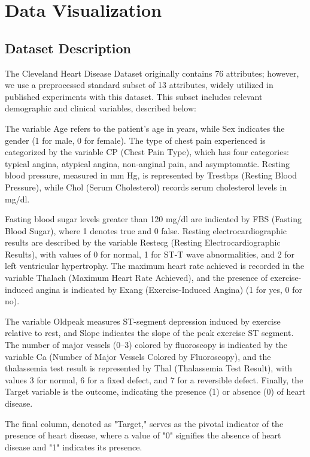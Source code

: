 \section{Data Visualization}
\label{sec:Data Visualization}
\subsection{Dataset Description}
The Cleveland Heart Disease Dataset\cite{HeartDiseaseCleveland} originally contains 76 attributes; however, we use a preprocessed standard subset\cite{HeartDiseaseKaggle} of 13 attributes, widely utilized in published experiments with this dataset. This subset includes relevant demographic and clinical variables, described below:

The variable Age refers to the patient’s age in years, while Sex indicates the gender (1 for male, 0 for female). The type of chest pain experienced is categorized by the variable CP (Chest Pain Type), which has four categories: typical angina, atypical angina, non-anginal pain, and asymptomatic. Resting blood pressure, measured in mm Hg, is represented by Trestbps (Resting Blood Pressure), while Chol (Serum Cholesterol) records serum cholesterol levels in mg/dl.

Fasting blood sugar levels greater than 120 mg/dl are indicated by FBS (Fasting Blood Sugar), where 1 denotes true and 0 false. Resting electrocardiographic results are described by the variable Restecg (Resting Electrocardiographic Results), with values of 0 for normal, 1 for ST-T wave abnormalities, and 2 for left ventricular hypertrophy. The maximum heart rate achieved is recorded in the variable Thalach (Maximum Heart Rate Achieved), and the presence of exercise-induced angina is indicated by Exang (Exercise-Induced Angina) (1 for yes, 0 for no).

The variable Oldpeak measures ST-segment depression induced by exercise relative to rest, and Slope indicates the slope of the peak exercise ST segment. The number of major vessels (0–3) colored by fluoroscopy is indicated by the variable Ca (Number of Major Vessels Colored by Fluoroscopy), and the thalassemia test result is represented by Thal (Thalassemia Test Result), with values 3 for normal, 6 for a fixed defect, and 7 for a reversible defect. Finally, the Target variable is the outcome, indicating the presence (1) or absence (0) of heart disease.

The final column, denoted as "Target," serves as the pivotal indicator of the presence of heart disease, where a value of "0" signifies the absence of heart disease and "1" indicates its presence.

